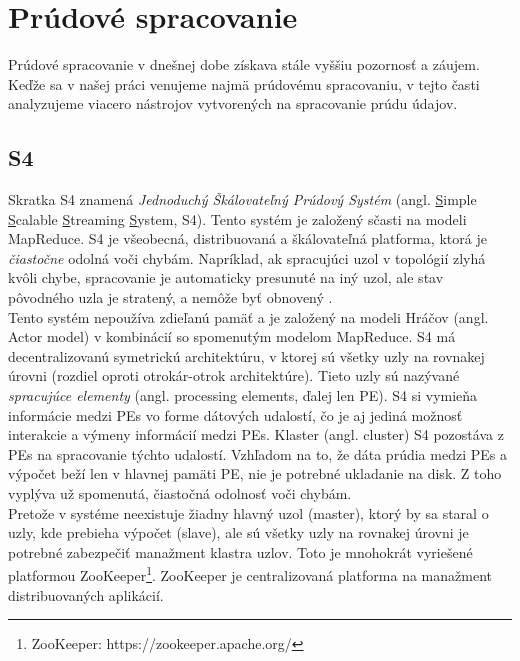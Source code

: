 \section{Prúdové spracovanie}
Prúdové spracovanie v dnešnej dobe získava stále vyššiu pozornosť a záujem. Keďže sa v našej práci venujeme najmä prúdovému spracovaniu, v tejto časti analyzujeme viacero nástrojov vytvorených na spracovanie prúdu údajov.

\subsection{S4}
Skratka S4 znamená \textit{Jednoduchý Škálovateľný Prúdový Systém} (angl. \underline{S}imple \underline{S}calable \underline{S}treaming \underline{S}ystem, S4). Tento systém je založený sčasti na modeli MapReduce. S4 je všeobecná, distribuovaná a škálovateľná platforma, ktorá je \textit{čiastočne} odolná voči chybám. Napríklad, ak spracujúci uzol v topológií zlyhá kvôli chybe, spracovanie je automaticky presunuté na iný uzol, ale stav pôvodného uzla je stratený, a nemôže byť obnovený \citep{neumeyer2010s4}.
 \\[5pt]
Tento systém nepoužíva zdieľanú pamäť a je založený na modeli Hráčov (angl. Actor model) v kombinácií so spomenutým modelom MapReduce. S4 má decentralizovanú symetrickú architektúru, v ktorej sú všetky uzly na rovnakej úrovni (rozdiel oproti otrokár-otrok architektúre). Tieto uzly sú nazývané \textit{spracujúce elementy} (angl. processing elements, ďalej len PE). S4 si vymieňa informácie medzi PEs vo forme dátových udalostí, čo je aj jediná možnosť interakcie a výmeny informácií medzi PEs. Klaster (angl. cluster) S4 pozostáva z PEs na spracovanie týchto udalostí. Vzhľadom na to, že dáta prúdia medzi PEs a výpočet beží len v hlavnej pamäti PE, nie je potrebné ukladanie na disk. Z toho vyplýva už spomenutá, čiastočná odolnosť voči chybám. 
 \\[5pt]
Pretože v systéme neexistuje žiadny hlavný uzol (master), ktorý by sa staral o uzly, kde prebieha výpočet (slave), ale sú všetky uzly na rovnakej úrovni je potrebné zabezpečiť manažment klastra uzlov. Toto je mnohokrát vyriešené platformou ZooKeeper\footnote{ZooKeeper: https://zookeeper.apache.org/}. ZooKeeper je centralizovaná platforma na manažment distribuovaných aplikácií.

